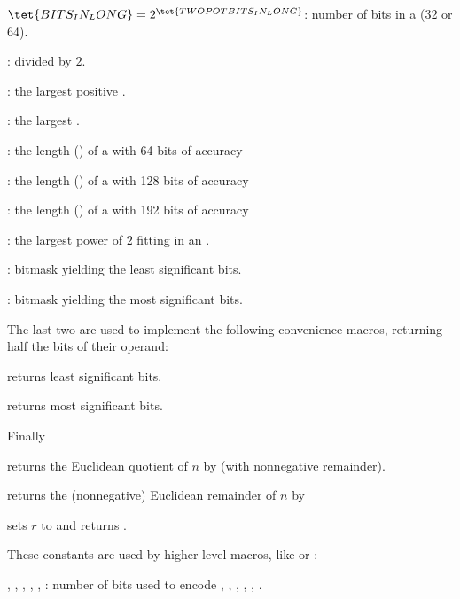 
\noindent {} $\tet{BITS_IN_LONG} = 2^{\tet{TWOPOTBITS_IN_LONG}}$:
number of bits in a  (32 or 64).

\noindent {} :  divided by
$2$.

\noindent {} : the largest positive .

\noindent {} : the largest .

\noindent {} :    the length () of a
 with 64 bits of accuracy

\noindent {} : the length () of a
 with 128 bits of accuracy

\noindent {} : the length () of a
 with 192 bits of accuracy

\noindent {} : the largest power of $2$ fitting in an
.

\noindent {} : bitmask yielding the least significant
bits.

\noindent {} : bitmask yielding the most significant
bits.

\noindent The last two are used to implement the following convenience macros,
returning half the bits of their operand:

 returns least significant bits.

 returns most significant bits.

\noindent Finally

 returns the Euclidean quotient of $n$ by
 (with nonnegative remainder).

 returns the (nonnegative) Euclidean remainder of $n$
by 


 sets $r$ to 
and returns .


These constants are used by higher level macros, like  or :

\noindent {},
,
,
,
,
:
number of bits used to encode , , ,
, , .

